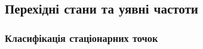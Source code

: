 {%
%
%
%
%
%
%

\subsection{Перехідні стани та уявні частоти}

\subsubsection{Класифікація стаціонарних точок}

}
